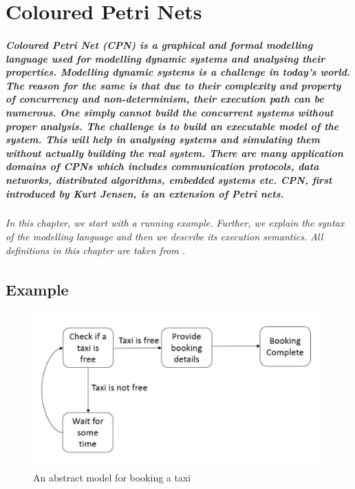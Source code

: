 \graphicspath{{./images/CPN/}}
\chapter{Coloured Petri Nets}
\label{ch:CPN}
\paragraph*{\textnormal{Coloured Petri Net (CPN) is a graphical and formal modelling language used for modelling dynamic systems and analysing their properties. Modelling dynamic systems is a challenge in today's world. The reason for the same is that due to their complexity and property of concurrency and non-determinism, their execution path can be numerous. One simply cannot build the concurrent systems without proper analysis. The challenge is to build an executable model of the system. This will help in analysing systems and simulating them without actually building the real system. There are many application domains of CPNs which includes communication protocols, data networks, distributed algorithms, embedded systems etc. CPN, first introduced by Kurt Jensen, is an extension of Petri nets.}}

\subparagraph*{\textnormal{In this chapter, we start with a running example. Further, we explain the syntax of the modelling language and then we describe its execution semantics. All definitions in this chapter are taken from \cite{DBLP:books/daglib/CPN_Book}.}}

\section{Example} \label{sec:CPN_Example}
\begin{figure}[!htbp]
	\centering
	\includegraphics[scale = 0.5]{CPN_abstract_taxi_example.pdf}
	\caption{An abstract model for booking a taxi}
	\label{fig:CPN_abstract_taxi_example}
\end{figure}
